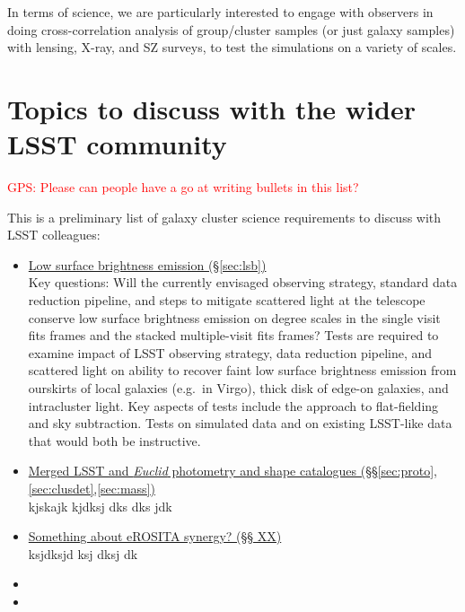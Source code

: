 \documentclass[a4paper,11pt]{article}
\newcommand{\red}{\textcolor{red}}
\begin{document}
In terms of science, we are particularly interested to engage with observers in doing cross-correlation analysis of group/cluster samples (or just galaxy samples) with lensing, X-ray, and SZ surveys, to test the simulations on a variety of scales.   


\section{Topics to discuss with the wider LSST community}

\red{GPS: Please can people have a go at writing bullets in this
  list?}

\noindent This is a preliminary list of galaxy cluster science
requirements to discuss with LSST colleagues:
\begin{itemize}
\item\underline{Low surface brightness emission
  (\S\ref{sec:lsb})}\smallskip\\Key questions: Will the currently
  envisaged observing strategy, standard data reduction pipeline, and
  steps to mitigate scattered light at the telescope conserve low
  surface brightness emission on degree scales in the single visit
  fits frames and the stacked multiple-visit fits frames?  Tests are
  required to examine impact of LSST observing strategy, data
  reduction pipeline, and scattered light on ability to recover faint
  low surface brightness emission from ourskirts of local galaxies
  (e.g.\ in Virgo), thick disk of edge-on galaxies, and intracluster
  light.  Key aspects of tests include the approach to flat-fielding
  and sky subtraction.  Tests on simulated data and on existing
  LSST-like data that would both be instructive.
\item\underline{Merged LSST and \emph{Euclid} photometry and shape
  catalogues
  (\S\S\ref{sec:proto},\ref{sec:clusdet},\ref{sec:mass})}\smallskip\\kjskajk
  kjdksj dks dks jdk
\item\underline{Something about eROSITA synergy? (\S\S
  XX)}\smallskip\\ksjdksjd ksj dksj dk
\item
\item
\end{itemize}

\end{document}
